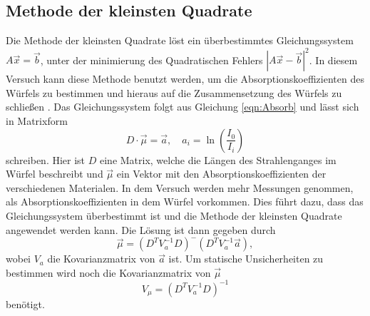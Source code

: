 \subsection{Methode der kleinsten Quadrate}
Die Methode der kleinsten Quadrate löst ein überbestimmtes Gleichungssystem $A\vec{x} = \vec{b}$, unter der minimierung des Quadratischen Fehlers $ |A\vec{x} -\vec{b}|^2$. In diesem Versuch kann diese Methode benutzt werden, um die Absorptionskoeffizienten des Würfels zu bestimmen und hieraus auf die Zusammensetzung des Würfels zu schließen . 
Das Gleichungssystem folgt aus Gleichung \ref{eqn:Absorb} und lässt sich in Matrixform
\begin{equation*}
    D \cdot \vec{\mu} = \vec{a} , \quad a_i = \ln \left(\frac{I_0}{I_i} \right)
\end{equation*}
schreiben.
Hier ist $D$ eine Matrix, welche die Längen des Strahlenganges im Würfel beschreibt und $\vec{\mu}$ ein Vektor mit den Absorptionskoeffizienten der verschiedenen Materialen.
In dem Versuch werden mehr Messungen genommen, als Absorptionskoeffizienten in dem Würfel vorkommen. Dies führt dazu, dass das Gleichungssystem überbestimmt ist und die Methode der kleinsten Quadrate angewendet werden kann.
Die Lösung\cite{stat} ist dann gegeben durch 
\begin{equation*}
    \vec{\mu} = \left(D^T V_a^{-1} D \right)^- \left( D^T V_a^{-1} \vec{a}\right),
\end{equation*}
wobei $V_a$ die Kovarianzmatrix von $\vec{a}$ ist.
Um statische Unsicherheiten zu bestimmen wird noch die Kovarianzmatrix\cite{stat} von $\vec{\mu}$
\begin{equation*}
    V_{\mu} = \left(D^T V_a^{-1} D \right)^{-1}
\end{equation*}
benötigt.
